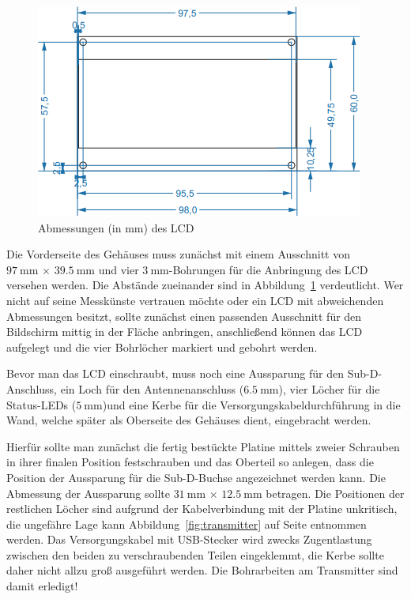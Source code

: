 \documentclass[paper=a4, parskip, numbers=noenddot, toc=listof, headsepline]{scrbook}
\begin{document}
				\begin{figure}
					\centering
					\includegraphics[]{bilder/lcddimensions}
					\caption{Abmessungen (in mm) des LCD}
					\label{fig:lcddimensions}
				\end{figure}

				Die Vorderseite des Gehäuses muss zunächst mit einem Ausschnitt von $\SI{97}{\milli\metre}\,\times\,\SI{39,5}{\milli\metre}$ und vier $\SI{3}{\milli\metre}$-Bohrungen für die Anbringung des LCD versehen werden. Die Abstände zueinander sind in Abbildung~\ref{fig:lcddimensions} verdeutlicht. Wer nicht auf seine Messkünste vertrauen möchte oder ein LCD mit abweichenden Abmessungen besitzt, sollte zunächst einen passenden Ausschnitt für den Bildschirm mittig in der Fläche anbringen, anschließend können das LCD aufgelegt und die vier Bohrlöcher markiert und gebohrt werden.

				Bevor man das LCD einschraubt, muss noch eine Aussparung für den Sub-D-Anschluss, ein Loch für den Antennenanschluss ($\SI{6,5}{\milli\metre}$), vier Löcher für die Status-LEDs ($\SI{5}{\milli\metre}$)und eine Kerbe für die Versorgungskabeldurchführung in die Wand, welche später als Oberseite des Gehäuses dient, eingebracht werden.

				Hierfür sollte man zunächst die fertig bestückte Platine mittels zweier Schrauben in ihrer finalen Position festschrauben und das Oberteil so anlegen, dass die Position der Aussparung für die Sub-D-Buchse angezeichnet werden kann. Die Abmessung der Aussparung sollte $\SI{31}{\milli\metre}\,\times\,\SI{12,5}{\milli\metre}$ betragen. Die Positionen der restlichen Löcher sind aufgrund der Kabelverbindung mit der Platine unkritisch, die ungefähre Lage kann Abbildung~\ref{fig:transmitter} auf Seite \pageref{fig:transmitter} entnommen werden. Das Versorgungskabel mit USB-Stecker wird zwecks Zugentlastung zwischen den beiden zu verschraubenden Teilen eingeklemmt, die Kerbe sollte daher nicht allzu groß ausgeführt werden. Die Bohrarbeiten am Transmitter sind damit erledigt!
\end{document}
